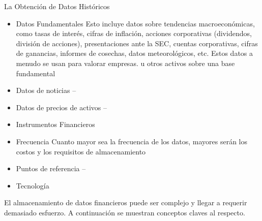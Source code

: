 \documentclass{article}
\begin{document}
La Obtención de Datos Históricos
\begin{itemize}
    \item Datos Fundamentales 
Esto incluye datos sobre tendencias macroeconómicas, como tasas de interés, cifras de inflación, acciones corporativas (dividendos, división de acciones), presentaciones ante la SEC, cuentas corporativas, cifras de ganancias, informes de cosechas, datos meteorológicos, etc. Estos datos a menudo se usan para valorar empresas. u otros activos sobre una base fundamental
\item Datos de noticias –
\item Datos de precios de activos –
\item Instrumentos Financieros
\item Frecuencia
Cuanto mayor sea la frecuencia de los datos, mayores serán los costos y los requisitos de almacenamiento
\item Puntos de referencia –
\item Tecnología
\end{itemize}



El almacenamiento de datos financieros puede ser complejo y llegar a requerir demasiado esfuerzo. A continuación se muestran conceptos claves al respecto.
\end{document}

